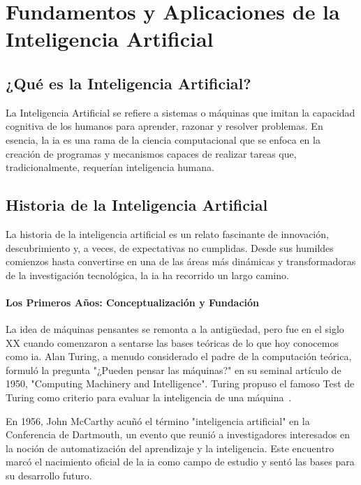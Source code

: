 \chapter{Fundamentos y Aplicaciones de la Inteligencia Artificial}

\section{¿Qué es la Inteligencia Artificial?}

La Inteligencia Artificial se refiere a sistemas o máquinas que imitan la capacidad cognitiva de los humanos para aprender, razonar y resolver problemas. En esencia, la \acrshort{ia} es una rama de la ciencia computacional que se enfoca en la creación de programas y mecanismos capaces de realizar tareas que, tradicionalmente, requerían inteligencia humana.

\section{Historia de la Inteligencia Artificial}

La historia de la inteligencia artificial es un relato fascinante de innovación, descubrimiento y, a veces, de expectativas no cumplidas. Desde sus humildes comienzos hasta convertirse en una de las áreas más dinámicas y transformadoras de la investigación tecnológica, la \acrshort{ia} ha recorrido un largo camino.

\subsubsection{Los Primeros Años: Conceptualización y Fundación}

La idea de máquinas pensantes se remonta a la antigüedad, pero fue en el siglo XX cuando comenzaron a sentarse las bases teóricas de lo que hoy conocemos como \acrshort{ia}. Alan Turing, a menudo considerado el padre de la computación teórica, formuló la pregunta "¿Pueden pensar las máquinas?" en su seminal artículo de 1950, "Computing Machinery and Intelligence". Turing propuso el famoso Test de Turing como criterio para evaluar la inteligencia de una máquina~\cite{turing1950computing}.

En 1956, John McCarthy acuñó el término "inteligencia artificial" en la Conferencia de Dartmouth, un evento que reunió a investigadores interesados en la noción de automatización del aprendizaje y la inteligencia. Este encuentro marcó el nacimiento oficial de la \acrshort{ia} como campo de estudio y sentó las bases para su desarrollo futuro.

